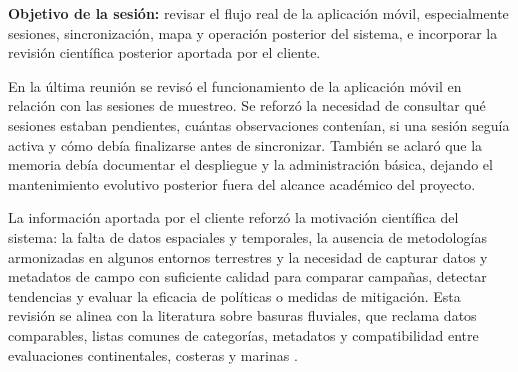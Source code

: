\textbf{Objetivo de la sesión:} revisar el flujo real de la aplicación móvil,
especialmente sesiones, sincronización, mapa y operación posterior del sistema, e
incorporar la revisión científica posterior aportada por el cliente.

En la última reunión se revisó el funcionamiento de la aplicación móvil en
relación con las sesiones de muestreo. Se reforzó la necesidad de consultar qué
sesiones estaban pendientes, cuántas observaciones contenían, si una sesión seguía
activa y cómo debía finalizarse antes de sincronizar. También se aclaró que la
memoria debía documentar el despliegue y la administración básica, dejando el
mantenimiento evolutivo posterior fuera del alcance académico del proyecto.

La información aportada por el cliente reforzó la motivación científica del sistema: la
falta de datos espaciales y temporales, la ausencia de metodologías armonizadas en
algunos entornos terrestres y la necesidad de capturar datos y metadatos de campo
con suficiente calidad para comparar campañas, detectar tendencias y evaluar la
eficacia de políticas o medidas de mitigación. Esta revisión se alinea con la
literatura sobre basuras fluviales, que reclama datos comparables, listas comunes
de categorías, metadatos y compatibilidad entre evaluaciones continentales,
costeras y marinas \cite{gonzalez2016riverine,gonzalezfernandez2017harmonized,ospar2025monitoring}.

